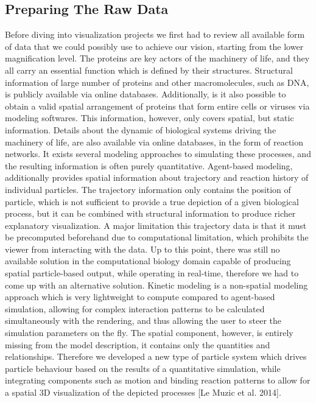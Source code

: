 \subsection{Preparing The Raw Data}

Before diving into visualization projects we first had to review all available form of data that we could possibly use to achieve our vision, starting from the lower magnification level.
The proteins are key actors of the machinery of life, and they all carry an essential function which is defined by their structures.
Structural information of large number of proteins and other macromolecules, such as DNA, is publicly available via online databases.
Additionally, is it also possible to obtain a valid spatial arrangement of proteins that form entire cells or viruses via modeling softwares.
This information, however, only covers spatial, but static information.
Details about the dynamic of biological systems driving the machinery of life, are also available via online databases, in the form of reaction networks.
It exists several modeling approaches to simulating these processes, and the resulting information is often purely quantitative.
Agent-based modeling, additionally provides spatial information about trajectory and reaction history of individual particles.
The trajectory information only contains the position of particle, which is not sufficient to provide a true depiction of a given biological process, but it can be combined with structural information to produce richer explanatory visualization.
A major limitation this trajectory data is that it must be precomputed beforehand due to computational limitation, which prohibits the viewer from interacting with the data.
Up to this point, there was still no available solution in the computational biology domain capable of producing spatial particle-based output, while operating in real-time, therefore we had to come up with an alternative solution.
Kinetic modeling is a non-spatial modeling approach which is very lightweight to compute compared to agent-based simulation, allowing for complex interaction patterns to be calculated simultaneously with the rendering, and thus allowing the user to steer the simulation parameters on the fly.
The spatial component, however, is entirely missing from the model description, it contains only the quantities and relationships.
Therefore we developed a new type of particle system which drives particle behaviour based on the results of a quantitative simulation, while integrating components such as motion and binding reaction patterns to allow for a spatial 3D visualization of the depicted processes [Le Muzic et al. 2014].

